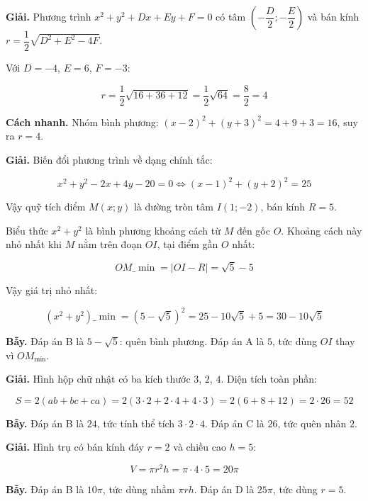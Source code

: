 \documentclass[11pt, a4paper]{article}
\begin{document}
\begin{dapan}[9 — Đáp án D]
\textbf{Giải.} Phương trình $x^2 + y^2 + Dx + Ey + F = 0$ có tâm $\left(-\dfrac{D}{2};-\dfrac{E}{2}\right)$ và bán kính $r = \dfrac{1}{2}\sqrt{D^2+E^2-4F}$.

Với $D = -4$, $E = 6$, $F = -3$:

$$r = \frac{1}{2}\sqrt{16 + 36 + 12} = \frac{1}{2}\sqrt{64} = \frac{8}{2} = 4$$

\textbf{Cách nhanh.} Nhóm bình phương: $(x-2)^2 + (y+3)^2 = 4 + 9 + 3 = 16$, suy ra $r = 4$.
\end{dapan}

\begin{dapan}[10 — Đáp án C]
\textbf{Giải.} Biến đổi phương trình về dạng chính tắc:

$$x^2+y^2-2x+4y-20=0 \iff (x-1)^2 + (y+2)^2 = 25$$

Vậy quỹ tích điểm $M(x;y)$ là đường tròn tâm $I(1;-2)$, bán kính $R = 5$.

Biểu thức $x^2+y^2$ là bình phương khoảng cách từ $M$ đến gốc $O$. Khoảng cách này nhỏ nhất khi $M$ nằm trên đoạn $OI$, tại điểm gần $O$ nhất:

$$OM\_{\min} = |OI - R| = \sqrt{5} - 5$$

Vậy giá trị nhỏ nhất:

$$(x^2+y^2)\_{\min} = (5-\sqrt{5})^2 = 25 - 10\sqrt{5} + 5 = 30 - 10\sqrt{5}$$

\textbf{Bẫy.} Đáp án B là $5 - \sqrt{5}$: quên bình phương. Đáp án A là $5$, tức dùng $OI$ thay vì $OM_{\min}$.
\end{dapan}

\begin{dapan}[11 — Đáp án A]
\textbf{Giải.} Hình hộp chữ nhật có ba kích thước $3$, $2$, $4$. Diện tích toàn phần:

$$S = 2(ab + bc + ca) = 2(3 \cdot 2 + 2 \cdot 4 + 4 \cdot 3) = 2(6 + 8 + 12) = 2 \cdot 26 = 52$$

\textbf{Bẫy.} Đáp án B là $24$, tức tính thể tích $3 \cdot 2 \cdot 4$. Đáp án C là $26$, tức quên nhân $2$.
\end{dapan}

\begin{dapan}[12 — Đáp án A]
\textbf{Giải.} Hình trụ có bán kính đáy $r = 2$ và chiều cao $h = 5$:

$$V = \pi r^2 h = \pi \cdot 4 \cdot 5 = 20\pi$$

\textbf{Bẫy.} Đáp án B là $10\pi$, tức dùng nhầm $\pi r h$. Đáp án D là $25\pi$, tức dùng $r = 5$.
\end{dapan}
\end{document}
